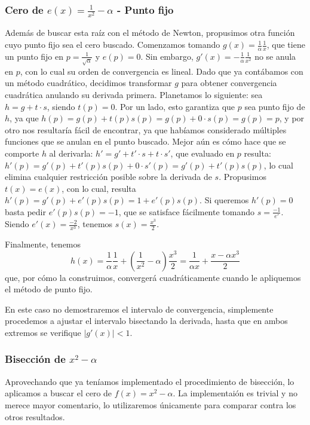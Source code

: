 \subsubsection{Cero de $e(x) = \frac{1}{x^2} - \alpha$ - Punto fijo}
Además de buscar esta raíz con el método de Newton, propusimos otra función cuyo punto fijo sea el cero buscado. Comenzamos tomando $g(x) = \frac{1}{\alpha} \frac{1}{x}$, que tiene un punto fijo en  $p = \frac{1}{\sqrt{\alpha}}$ y $e(p)= 0$. Sin embargo, $g'(x) = -\frac{1}{\alpha} \frac{1}{x^2}$ no se anula en $p$, con lo cual su orden de convergencia es lineal. Dado que ya contábamos con un método cuadrático, decidimos transformar $g$ para obtener convergencia cuadrática anulando su derivada primera. Planetamos lo siguiente: sea $h = g + t \cdot s$, siendo $t(p) = 0$. Por un lado, esto garantiza que $p$ sea punto fijo de $h$, ya que $h(p) = g(p) + t(p)s(p) = g(p) + 0\cdot s(p) = g(p) = p$, y por otro nos resultaría fácil de encontrar, ya que habíamos considerado múltiples funciones que se anulan en el punto buscado. Mejor aún es cómo hace que se comporte $h$ al derivarla: $h' = g' + t'\cdot s + t \cdot s'$, que evaluado en $p$ resulta: $h'(p) = g'(p) + t'(p)s(p) + 0\cdot s'(p) = g'(p) + t'(p)s(p)$, lo cual elimina cualquier restricción posible sobre la derivada de $s$. Propusimos $t(x) = e(x)$, con lo cual, resulta $h'(p) = g'(p) + e'(p)s(p) = 1 + e'(p)s(p)$. Si queremos $h'(p) = 0$ basta pedir $e'(p)s(p) = -1$, que se satisface fácilmente tomando $s = \frac{-1}{e'}$. Siendo $e'(x) = \frac{-2}{x^3}$, tenemos $s(x) = \frac{x^3}{2}$.

Finalmente, tenemos 
\begin{equation}
	h(x) = \frac{1}{\alpha} \frac{1}{x} + (\frac{1}{x^2} - \alpha)\frac{x^3}{2} =  \frac{1}{\alpha x} + \frac{x - \alpha x^3}{2}
\end{equation}
que, por cómo la construimos, convergerá cuadráticamente cuando le apliquemos el método de punto fijo.

En este caso no demostraremos el intervalo de convergencia, simplemente procedemos a ajustar el intervalo bisectando la derivada, hasta que en ambos extremos se verifique $|g'(x)| < 1$.

\subsubsection{Bisección de $x^2-\alpha$}
Aprovechando que ya teníamos implementado el procedimiento de bisección, lo aplicamos a buscar el cero de $f(x) = x^2-\alpha$. La implementaión es trivial y no merece mayor comentario, lo utilizaremos únicamente para comparar contra los otros resultados.



